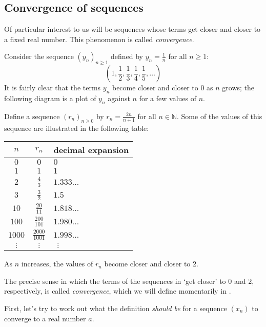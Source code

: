 \subsection*{Convergence of sequences}

Of particular interest to us will be sequences whose terms get closer and closer to a fixed real number. This phenomenon is called \textit{convergence}.

\begin{example}
\label{exOneOverN}
Consider the sequence $(y_n)_{n \ge 1}$ defined by $y_n = \frac{1}{n}$ for all $n \ge 1$:
\[ \left( 1, \frac{1}{2}, \frac{1}{3}, \frac{1}{4}, \frac{1}{5}, \dots\right) \]
It is fairly clear that the terms $y_n$ become closer and closer to $0$ as $n$ grows; the following diagram is a plot of $y_n$ against $n$ for a few values of $n$.
\end{example}

\begin{example}
\label{exTwoNOverNPlusOne}
Define a sequence $(r_n)_{n \ge 0}$ by $r_n = \frac{2n}{n+1}$ for all $n \in \mathbb{N}$. Some of the values of this sequence are illustrated in the following table:
\begin{center}
\begin{tabular}{c|c|l}
$n$ & $r_n$ & decimal expansion \\ \hline
$0$ & $0$ & $0$ \\
$1$ & $1$ & $1$ \\
$2$ & $\frac{4}{3}$ & $1.333\dots$ \\
$3$ & $\frac{3}{2}$ & $1.5$ \\
$10$ & $\frac{20}{11}$ & $1.818\dots$ \\
$100$ & $\frac{200}{101}$ & $1.980\dots$ \\
$1000$ & $\frac{2000}{1001}$ & $1.998\dots$ \\
$\vdots$ & $\vdots$ & $\ \ \vdots$
\end{tabular}
\end{center}
As $n$ increases, the values of $r_n$ become closer and closer to $2$.
\end{example}

The precise sense in which the terms of the sequences in  `get closer' to $0$ and $2$, respectively, is called \textit{convergence}, which we will define momentarily in .

First, let's try to work out what the definition \textit{should be} for a sequence $(x_n)$ to converge to a real number $a$.

